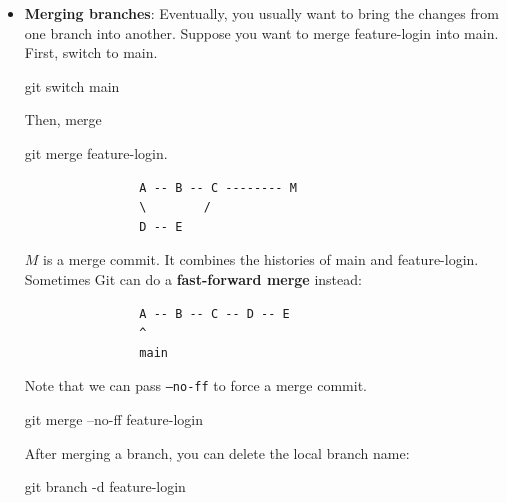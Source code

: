 \documentclass{report}
\begin{document}
\begin{itemize}
            \bigbreak \noindent 
            \begin{bashcode}
                git branch feature-login
            \end{bashcode}
            \bigbreak \noindent 
            Creates a branch but does not switch to it.
            \bigbreak \noindent 
            \begin{bashcode}
                git switch -c feature-login
                git checkout -b feature-login
            \end{bashcode}
            \bigbreak \noindent 
            Both create the branch and switch to it
        \item \textbf{Merging branches}: Eventually, you usually want to bring the changes from one branch into another. Suppose you want to merge feature-login into main. First, switch to main.
            \bigbreak \noindent 
            \begin{bashcode}
                git switch main
            \end{bashcode}
            \bigbreak \noindent 
            Then, merge
            \bigbreak \noindent 
            \begin{bashcode}
                git merge feature-login.
            \end{bashcode}
            \bigbreak \noindent 
            \begin{verbatim}
                A -- B -- C -------- M
                \        /
                D -- E 
            \end{verbatim}
            \bigbreak \noindent 
            $M$ is a merge commit. It combines the histories of main and feature-login. Sometimes Git can do a \textbf{fast-forward merge} instead:
            \bigbreak \noindent 
            \begin{verbatim}
                A -- B -- C -- D -- E
                ^
                main
            \end{verbatim}
            \bigbreak \noindent 
            Note that we can pass \texttt{--no-ff} to force a merge commit. 
            \bigbreak \noindent 
            \begin{bashcode}
                git merge --no-ff feature-login
            \end{bashcode}
            \bigbreak \noindent 
            After merging a branch, you can delete the local branch name:
            \bigbreak \noindent 
            \begin{bashcode}
                git branch -d feature-login

\end{bashcode}
\end{itemize}
\end{document}
